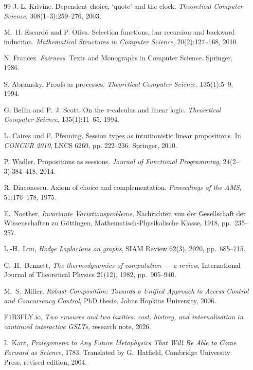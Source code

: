 \begin{thebibliography}{99}
J.-L. Krivine. Dependent choice, `quote' and the clock.
\emph{Theoretical Computer Science}, 308(1--3):259--276, 2003.

M.~H. Escard\'o and P. Oliva. Selection functions, bar recursion and backward
induction. \emph{Mathematical Structures in Computer Science}, 20(2):127--168, 2010.

N. Francez. \emph{Fairness}. Texts and Monographs in Computer Science. Springer, 1986.

S. Abramsky. Proofs as processes. \emph{Theoretical Computer Science},
135(1):5--9, 1994.

G. Bellin and P.~J. Scott. On the $\pi$-calculus and linear logic.
\emph{Theoretical Computer Science}, 135(1):11--65, 1994.

L. Caires and F. Pfenning. Session types as intuitionistic linear propositions.
In \emph{CONCUR 2010}, LNCS 6269, pp. 222--236. Springer, 2010.

P. Wadler. Propositions as sessions. \emph{Journal of Functional Programming},
24(2--3):384--418, 2014.

R. Diaconescu. Axiom of choice and complementation.
\emph{Proceedings of the AMS}, 51:176--178, 1975.


E.~Noether, \emph{Invariante Variationsprobleme}, Nachrichten von der Gesellschaft der Wissenschaften zu G\"ottingen, Mathematisch-Physikalische Klasse, 1918, pp.~235--257.

L.-H.~Lim, \emph{Hodge Laplacians on graphs}, SIAM Review 62(3), 2020, pp.~685--715.

C.~H.~Bennett, \emph{The thermodynamics of computation --- a review}, International Journal of Theoretical Physics 21(12), 1982, pp.~905--940.

M.~S.~Miller, \emph{Robust Composition: Towards a Unified Approach to Access Control and Concurrency Control}, PhD thesis, Johns Hopkins University, 2006.

F1R3FLY.io, \emph{Two erasures and two laxities: cost, history, and internalisation in continued interactive GSLTs}, research note, 2026.


I.~Kant, \emph{Prolegomena to Any Future Metaphysics That Will Be Able to Come Forward as Science}, 1783. Translated by G.~Hatfield, Cambridge University Press, revised edition, 2004.


\end{thebibliography}
